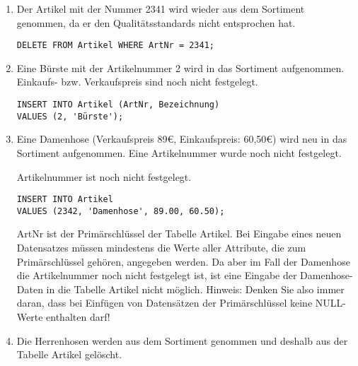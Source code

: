 \documentclass{lehramt-informatik-haupt}
\begin{document}
\begin{enumerate}
\begin{enumerate}

\item Der Artikel mit der Nummer 2341 wird wieder aus dem Sortiment
genommen, da er den Qualitätsstandards nicht entsprochen hat.

\begin{antwort}[muster]
\begin{verbatim}
DELETE FROM Artikel WHERE ArtNr = 2341;
\end{verbatim}
\end{antwort}


\item Eine Bürste mit der Artikelnummer 2 wird in das Sortiment
aufgenommen. Einkaufs- bzw. Verkaufspreis sind noch nicht festgelegt.

\begin{antwort}[muster]
\begin{verbatim}
INSERT INTO Artikel (ArtNr, Bezeichnung)
VALUES (2, 'Bürste');
\end{verbatim}
\end{antwort}


\item Eine Damenhose (Verkaufspreis 89€, Einkaufspreis: 60,50€) wird
neu in das Sortiment aufgenommen. Eine Artikelnummer wurde noch nicht
festgelegt.

\begin{antwort}[falsch]
Artikelnummer ist noch nicht festgelegt.
\begin{verbatim}
INSERT INTO Artikel
VALUES (2342, 'Damenhose', 89.00, 60.50);
\end{verbatim}
\end{antwort}

\begin{antwort}[muster]
ArtNr ist der Primärschlüssel der Tabelle Artikel. Bei Eingabe eines
neuen Datensatzes müssen mindestens die Werte aller Attribute, die zum
Primärschlüssel gehören, angegeben werden. Da aber im Fall der Damenhose
die Artikelnummer noch nicht festgelegt ist, ist eine Eingabe der
Damenhose-Daten in die Tabelle Artikel nicht möglich. Hinweis: Denken
Sie also immer daran, dass bei Einfügen von Datensätzen der
Primärschlüssel keine NULL-Werte enthalten darf!
\end{antwort}


\item Die Herrenhosen werden aus dem Sortiment genommen und deshalb aus
der Tabelle Artikel gelöscht.


\end{enumerate}
\end{enumerate}
\end{document}

